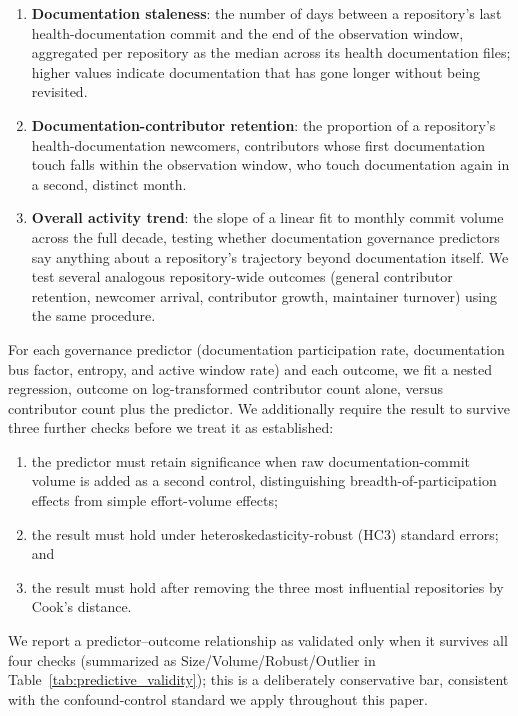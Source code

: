 \documentclass[10pt,conference]{IEEEtran}
\begin{document}
{\begin{enumerate}[label=\roman*.]
  \item \textbf{Documentation staleness}: the number of days between a repository's last health-documentation commit and the end of the observation window, aggregated per repository as the median across its health documentation files; higher values indicate documentation that has gone longer without being revisited.
  \item \textbf{Documentation-contributor retention}: the proportion of a repository's health-documentation newcomers, contributors whose first documentation touch falls within the observation window, who touch documentation again in a second, distinct month.
  \item \textbf{Overall activity trend}: the slope of a linear fit to monthly commit volume across the full decade, testing whether documentation governance predictors say anything about a repository's trajectory beyond documentation itself. We test several analogous repository-wide outcomes (general contributor retention, newcomer arrival, contributor growth, maintainer turnover) using the same procedure.
\end{enumerate}

For each governance predictor (documentation participation rate, documentation bus factor, entropy, and active window rate) and each outcome, we fit a nested regression, outcome on log-transformed contributor count alone, versus contributor count plus the predictor. We additionally require the result to survive three further checks before we treat it as established:

\begin{enumerate}[label=\roman*.]
  \item the predictor must retain significance when raw documentation-commit volume is added as a second control, distinguishing breadth-of-participation effects from simple effort-volume effects;
  \item the result must hold under heteroskedasticity-robust (HC3) standard errors; and
  \item the result must hold after removing the three most influential repositories by Cook's distance.
\end{enumerate}

We report a predictor--outcome relationship as validated only when it survives all four checks (summarized as Size/Volume/Robust/Outlier in Table~\ref{tab:predictive_validity}); this is a deliberately conservative bar, consistent with the confound-control standard we apply throughout this paper.

}
\end{document}
